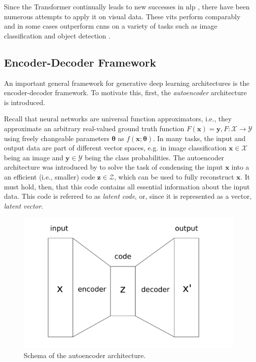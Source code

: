 Since the Transformer continually leads to new successes in \gls{nlp} \citep{DBLP:conf/naacl/DevlinCLT19,DBLP:conf/nips/BrownMRSKDNSSAA20,DBLP:journals/corr/abs-2302-13971}, there have been numerous attempts to apply it on visual data. These \glspl{vit} perform comparably and in some cases outperform \glspl{cnn} on a variety of tasks such as image classification and object detection \citep{DBLP:conf/iclr/DosovitskiyB0WZ21,liu2021Swin}.


\subsection{Encoder-Decoder Framework}
\label{subsec:bg.vae}

An important general framework for generative deep learning architectures is the encoder-decoder framework. To motivate this, first, the \emph{autoencoder} architecture \citep{https://doi.org/10.1002/aic.690370209} is introduced.

Recall that neural networks are universal function approximators, i.e., they approximate an arbitrary real-valued ground truth function $F(\textbf{x})=\textbf{y}, F: \mathcal{X} \rightarrow \mathcal{Y}$ using freely changeable parameters $\boldsymbol{\theta}$ as $f(\mathbf{x};\boldsymbol{\theta})$. In many tasks, the input and output data are part of different vector spaces, e.g. in image classification $\mathbf{x}\in\mathcal{X}$ being an image and $\mathbf{y}\in\mathcal{Y}$ being the class probabilities. The autoencoder architecture was introduced by \citet{https://doi.org/10.1002/aic.690370209} to solve the task of condensing the input $\mathbf{x}$ into a an efficient (i.e., smaller) code $\mathbf{z}\in\mathcal{Z}$, which can be used to fully reconstruct $\mathbf{x}$. It must hold, then, that this code contains all essential information about the input data. This code is referred to as \emph{latent code}, or, since it is represented as a vector, \emph{latent vector}.

\begin{figure}
    \centering
    \includegraphics[width=\textwidth]{graphics/autoencoder.pdf}
    \caption{Schema of the autoencoder architecture.}
    \label{fig:autoencoder}
\end{figure}

